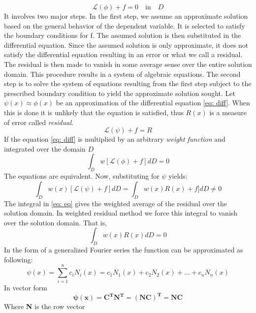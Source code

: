 \begin{equation}
\label{eq: diff}
\mathscr{L}(\phi) +f=0 \quad \textrm{in} \quad D
\end{equation}
It involves two major steps. In the first step, we assume an approximate solution
based on the general behavior of the dependent variable. It is selected to satisfy the boundary conditions for f. The assumed solution is then substituted in the differential equation. Since the assumed solution is only approximate, it does not satisfy the differential equation resulting in an error or what we call a residual. The residual is then made to vanish in some average sense over the entire solution domain. This procedure results in a system of algebraic equations. The second step is to solve the system of equations resulting from the first step subject to the prescribed boundary condition to yield the approximate solution sought.
Let $\psi(x) \approx \phi(x)$  be an approximation of the differential equation \ref{eq: diff}. When this is done it is unlikely that the equation is satisfied, thus $R(x)$ is a measure of error called \textit{residual}.
\begin{equation}
\label{eq: sub}
\mathscr{L}(\psi) +f=R
\end{equation}
If the equation \ref{eq: diff} is multiplied by an arbitrary \textit{weight function} and integrated over the domain $D$
\begin{equation}
\int_D w[\mathscr{L}(\phi) +f]dD=0 
\end{equation}
The equations are equivalent. Now, substituting for $\psi$ yields:
\begin{equation}
\label{eq: eq}
\int_D w(x)[\mathscr{L}(\psi) +f]dD=\int_D w(x)R(x) +f]dD \neq 0 
\end{equation}
The integral in \ref{eq: eq} gives the weighted average of the residual over the solution domain. In weighted residual method we force this integral to vanish over the solution domain. That is,
\begin{equation}
\int_D w(x)R(x)dD=0 
\end{equation}
In the form of a generalized Fourier series the function can be approximated as following:
\begin{equation}
\psi(x)=\sum_{i=1}^nc_iN_i(x)=c_1N_1(x)+c_2N_2(x)+...+c_nN_n(x)
\end{equation}
In vector form
\begin{equation}
\boldsymbol{\psi(x)=C^TN^T=(NC)^T=NC}
\end{equation}
Where \textbf{N} is the row vector 
